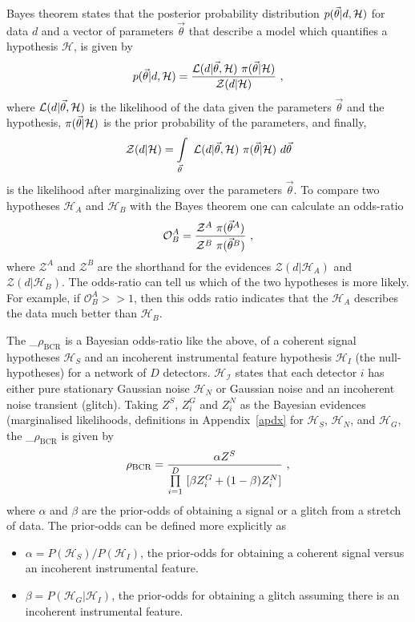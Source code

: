 \documentclass[%
 nofootinbib,
 amsmath,amssymb,
 aps,
 twocolumn
]{revtex4-2}
\newcommand{\mathcmd}[1]{{\sc \relax\ifmmode#1\else $#1$\fi}\xspace}
\newcommand{\bcr}{\mathcmd{\rho_\text{BCR}}}
\newcommand{\parameters}{\mathcmd{\vec{\theta}}}
\begin{document}
Bayes theorem states that the posterior probability distribution $p(\parameters|d,\mathcal{H})$ for data $d$ and a vector of parameters \parameters that describe a model which quantifies a hypothesis $\mathcal{H}$, is given by
\begin{equation}
p(\parameters|d,\mathcal{H}) = \frac{\mathcal{L}(d|\parameters, \mathcal{H}) \ \pi(\parameters | \mathcal{H})}{\mathcal{Z}(d|\mathcal{H})}\ , 
\end{equation}
where $\mathcal{L}(d|\parameters, \mathcal{H})$ is the likelihood of the data given the parameters \parameters and the hypothesis, $\pi(\parameters | \mathcal{H})$ is the prior probability of the parameters, and finally,
\begin{equation}
    \mathcal{Z}(d|\mathcal{H}) = \int\limits_{\parameters} \ \mathcal{L}(d|\parameters,\mathcal{H}) \ \pi(\parameters | \mathcal{H}) \ d\parameters
\end{equation} is the likelihood after marginalizing over the parameters \parameters.  To compare two hypotheses $\mathcal{H}_A$ and $\mathcal{H}_B$ with the Bayes theorem one can calculate an odds-ratio
\begin{equation}
    \mathcal{O}^A_B = \frac{\mathcal{Z}^A\ \pi(\parameters^A)}{\mathcal{Z}^B\ \pi(\parameters^B)}\ ,
\end{equation}
where $\mathcal{Z}^A$ and $\mathcal{Z}^B$ are the shorthand for the evidences  $\mathcal{Z}(d|\mathcal{H}_A)$ and $\mathcal{Z}(d|\mathcal{H}_B)$. The odds-ratio can tell us which of the two hypotheses is more likely. For example, if $\mathcal{O}^A_B >> 1$, then this odds ratio indicates that the $\mathcal{H}_A$ describes the data much better than $\mathcal{H}_B$. 

The \bcr is a Bayesian odds-ratio like the above, of a coherent signal hypotheses $\mathcal{H}_S$ and an incoherent instrumental feature hypothesis $\mathcal{H}_I$ (the null-hypotheses) for a network of $D$ detectors. $\mathcal{H_I}$ states that each detector $i$ has either pure stationary Gaussian noise $\mathcal{H}_N$ or Gaussian noise and an incoherent noise transient (glitch). Taking $Z^S$, $Z^G_i$ and $Z^N_i$ as the Bayesian evidences (marginalised likelihoods, definitions in Appendix~\ref{apdx} for $\mathcal{H}_S$, $\mathcal{H}_N$, and $\mathcal{H}_G$, the \bcr is given by
\begin{equation}
\label{eq:bcr}
\bcr = \frac{\alpha Z^S}{\prod\limits^D_{i=1} \ [\beta Z^G_i + (1-\beta)Z^N_i]}\ ,
\end{equation}
where $\alpha$ and $\beta$ are the prior-odds of obtaining a signal or a glitch from a stretch of data. The prior-odds can be defined more explicitly as 
\begin{itemize}
    \item $\alpha=P(\mathcal{H}_S)/P(\mathcal{H}_I)$, the prior-odds for obtaining a coherent signal versus an incoherent instrumental feature.
    \item $\beta=P(\mathcal{H}_G| \mathcal{H}_I)$, the prior-odds for obtaining a glitch assuming there is an incoherent instrumental feature.
\end{itemize}
\end{document}
